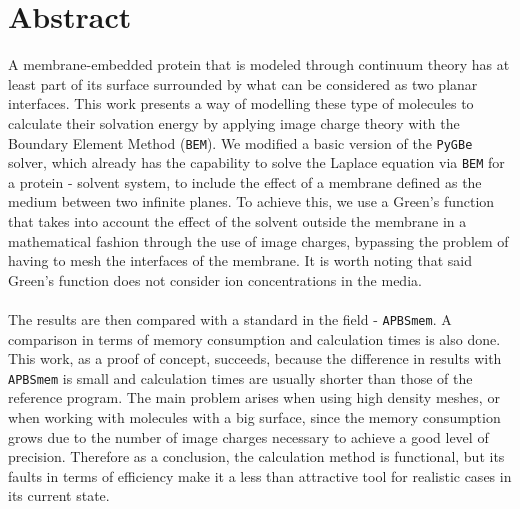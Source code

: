 \section*{Abstract}
\noindent
A membrane-embedded protein that is modeled through continuum theory has at least part of its surface surrounded by what can be considered as two planar interfaces. This work presents a way of modelling these type of molecules to calculate their solvation energy by applying image charge theory with the Boundary Element Method (\texttt{BEM}). We modified a basic version of the \texttt{PyGBe} solver, which already has the capability to solve the Laplace equation via \texttt{BEM} for a protein - solvent system, to include the effect of a membrane defined as the medium between two infinite planes. To achieve this, we use a Green's function that takes into account the effect of the solvent outside the membrane in a mathematical fashion through the use of image charges, bypassing the problem of having to mesh the interfaces of the membrane. It is worth noting that said Green's function does not consider ion concentrations in the media.\\\\
The results are then compared with a standard in the field - \texttt{APBSmem}. A comparison in terms of memory consumption and calculation times is also done. This work, as a proof of concept, succeeds, because the difference in results with \texttt{APBSmem} is small and calculation times are usually shorter than those  of the reference program. The main problem arises when using high density meshes, or when working with molecules with a big surface, since the memory consumption grows due to the number of image charges necessary to achieve a good level of precision. Therefore as a conclusion, the calculation method is functional, but its faults in terms of efficiency make it a less than attractive tool for realistic cases in its current state.